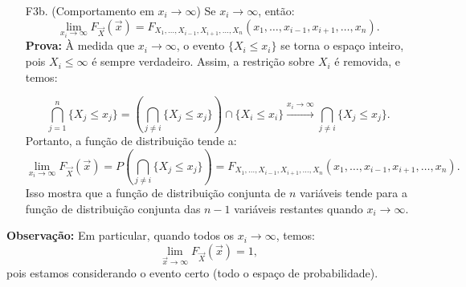\begin{frame}
	\begin{block}{}
		\begin{enumerate}	
				\item[F3b.](Comportamento em \( x_i \to \infty \))	Se \( x_i \to \infty \), então:
					\[
				\lim_{x_i \to \infty} F_{\vec{X}}(\vec{x}) = F_{X_1, \dots, X_{i-1}, X_{i+1}, \dots, X_n}(x_1, \dots, x_{i-1}, x_{i+1}, \dots, x_n).
				\]
		\medskip
{\bf Prova:} À medida que \( x_i \to \infty \), o evento \( \{ X_i \leq x_i \} \) se torna o espaço inteiro, pois \( X_i \leq \infty \) é sempre verdadeiro. Assim, a restrição sobre \( X_i \) é removida, e temos:

\[
\bigcap_{j=1}^{n} \{ X_j \leq x_j \} = \left( \bigcap_{j \neq i} \{ X_j \leq x_j \} \right) \cap \{ X_i \leq x_i \} \xrightarrow{x_i \to \infty} \bigcap_{j \neq i} \{ X_j \leq x_j \}.
\]
Portanto, a função de distribuição tende a:
\[
\lim_{x_i \to \infty} F_{\vec{X}}(\vec{x}) = P\left( \bigcap_{j \neq i} \{ X_j \leq x_j \} \right) = F_{X_1, \dots, X_{i-1}, X_{i+1}, \dots, X_n}(x_1, \dots, x_{i-1}, x_{i+1}, \dots, x_n).
\]
Isso mostra que a função de distribuição conjunta de \( n \) variáveis tende para a função de distribuição conjunta das \( n - 1 \) variáveis restantes quando \( x_i \to \infty \).
					\end{enumerate}
\end{block}
{\bf Observação:}
 Em particular, quando todos os \( x_i \to \infty \), temos: \[
\lim_{\vec{x} \to \infty} F_{\vec{X}}(\vec{x}) = 1,
\] pois estamos considerando o evento certo (todo o espaço de probabilidade).

\end{frame}	

